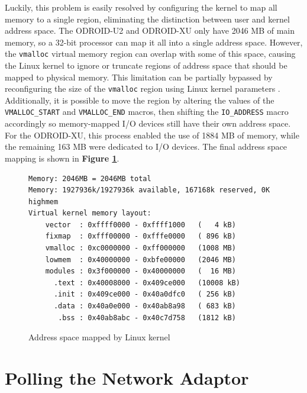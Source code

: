 \documentclass[11pt]{book}
\begin{document}
Luckily, this problem is easily resolved by configuring the kernel to map all
memory to a single region, eliminating the distinction between user and kernel
address space. The ODROID-U2 and ODROID-XU only have 2046 MB of main memory, so
a 32-bit processor can map it all into a single address space. However, the
\verb;vmalloc; virtual memory region can overlap with some of this space,
causing the Linux kernel to ignore or truncate regions of address space that
should be mapped to physical memory. This limitation can be partially bypassed
by reconfiguring the size of the \verb;vmalloc; region using Linux kernel
parameters \cite{vmalloc-overlap}. Additionally, it is possible to move the
region by altering the values of the \verb;VMALLOC_START; and \verb;VMALLOC_END;
macros, then shifting the \verb;IO_ADDRESS; macro accordingly so memory-mapped
I/O devices still have their own address space. For the ODROID-XU, this process
enabled the use of 1884 MB of memory, while the remaining 163 MB were dedicated
to I/O devices. The final address space mapping is shown in \textbf{Figure
  \ref{addrmap}}.


\begin{figure}[h]
\begin{center}
\begin{verbatim}
Memory: 2046MB = 2046MB total
Memory: 1927936k/1927936k available, 167168k reserved, 0K highmem
Virtual kernel memory layout:
    vector  : 0xffff0000 - 0xffff1000   (   4 kB)
    fixmap  : 0xfff00000 - 0xfffe0000   ( 896 kB)
    vmalloc : 0xc0000000 - 0xff000000   (1008 MB)
    lowmem  : 0x40000000 - 0xbfe00000   (2046 MB)
    modules : 0x3f000000 - 0x40000000   (  16 MB)
      .text : 0x40008000 - 0x409ce000   (10008 kB)
      .init : 0x409ce000 - 0x40a0dfc0   ( 256 kB)
      .data : 0x40a0e000 - 0x40ab8a98   ( 683 kB)
       .bss : 0x40ab8abc - 0x40c7d758   (1812 kB)
\end{verbatim}
\end{center}
\caption{Address space mapped by Linux kernel}
\label{addrmap}
\end{figure}

\section{\textbf{Polling the Network Adaptor}}
\end{document}
